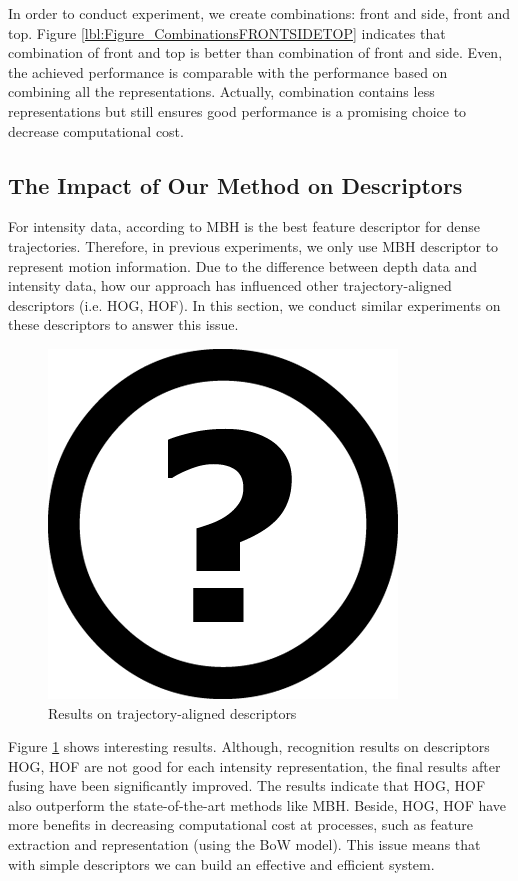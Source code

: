 \documentclass[review]{elsarticle}
\begin{document}
In order to conduct experiment, we create combinations: front and side, front and top. Figure \ref{lbl:Figure_CombinationsFRONTSIDETOP} indicates that combination of front and top is better than combination of front and side. Even, the achieved performance is comparable with the performance based on combining all the representations. Actually, combination contains less representations but still ensures good performance is a promising choice to decrease computational cost.

\subsection{The Impact of Our Method on Descriptors}

For intensity data, according to \cite{wang2011densetraj} MBH is the best feature descriptor for dense trajectories. Therefore, in previous experiments, we only use MBH descriptor to represent motion information. Due to the difference between depth data and intensity data, how our approach has influenced other trajectory-aligned descriptors (i.e. HOG, HOF). In this section, we conduct similar experiments on these descriptors to answer this issue.

\begin{figure}[H]
	\begin{center}
		\includegraphics[scale=0.5]{Unknown.png}
	\end{center}
	\caption{\label{lbl:Figure_MBHHOGHOF}Results on trajectory-aligned descriptors}
\end{figure}

Figure \ref{lbl:Figure_MBHHOGHOF} shows interesting results. Although, recognition results on descriptors HOG, HOF are not good for each intensity representation, the final results after fusing have been significantly improved. The results indicate that HOG, HOF also outperform the state-of-the-art methods like MBH. Beside, HOG, HOF have more benefits in decreasing computational cost at processes, such as feature extraction and representation (using the BoW model). This issue means that with simple descriptors we can build an effective and efficient system.
\end{document}

